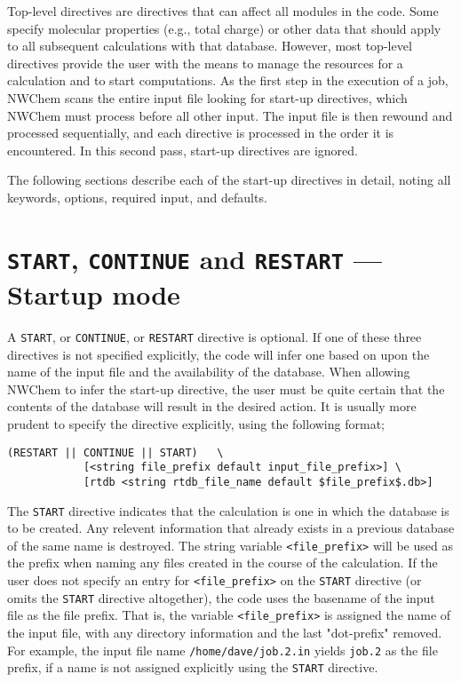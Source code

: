 \label{sec:toplevel}

Top-level directives are directives that can affect all
modules in the code.  Some specify molecular properties (e.g., total
charge) or other data that should apply to all subsequent
calculations with that database.  However, most top-level directives 
provide the user
with the means to manage the resources for a calculation and to start
computations.  As the first step in the execution of a job, NWChem
scans the entire input file looking for start-up directives, which
NWChem must process before all other input.  The input file is then
rewound and processed sequentially, and each directive is processed in
the order it is encountered.  In this second pass, start-up directives
are ignored.

The following sections describe each of the start-up directives in detail,
noting all keywords, options, required input, and defaults.

\section{{\tt START}, {\tt CONTINUE} and {\tt RESTART} --- Startup mode}
\label{sec:start}

A {\tt START}, or {\tt CONTINUE}, or {\tt RESTART} directive is
optional.  If one of these three directives is not specified
explicitly, the code will infer one based on upon the name of the
input file and the availability of the database.  When allowing NWChem
to infer the start-up directive, the user must be quite certain that
the contents of the database will result in the desired action.  It
is usually more prudent to specify the directive explicitly, using the
following format;

\begin{verbatim}
(RESTART || CONTINUE || START)   \
            [<string file_prefix default input_file_prefix>] \
            [rtdb <string rtdb_file_name default $file_prefix$.db>]
\end{verbatim}

The \verb+START+ directive indicates that the calculation is one in
which the database is to be created.  Any relevent information that
already exists in a previous database of the same name is destroyed.
The string variable {\tt <file\_prefix>} will be used as the prefix
when naming any files created in the course of the calculation.  If
the user does not specify an entry for {\tt <file\_prefix>} on the
\verb+START+ directive (or omits the \verb+START+ directive
altogether), the code uses the basename of the input file as the file
prefix.  That is, the variable {\tt <file\_prefix>} is assigned
the name of the input file, with any directory
information and the last "dot-prefix" removed.  For example,
the input file
name \verb+/home/dave/job.2.in+ yields \verb+job.2+ as the file
prefix, if a name is not assigned explicitly using the \verb+START+
directive.

